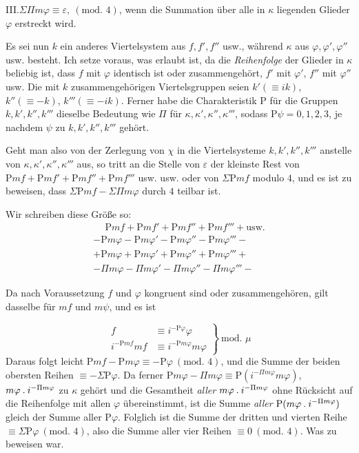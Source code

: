 III.\quad $\Sigma\Pi m\varphi\equiv\varepsilon,\ (\text{mod. }4)$, wenn die Summation über alle in $\kappa$ liegenden Glieder $\varphi$ erstreckt wird.

Es sei nun $k$ ein anderes Viertelsystem aus $f,f',f''$ usw., während $\kappa$ aus $\varphi,\varphi',\varphi''$ usw. besteht. Ich setze voraus, was erlaubt ist, da die \emph{Reihenfolge} der Glieder in $\kappa$ beliebig ist, dass $f$ mit $\varphi$ identisch ist oder zusammengehört, $f'$ mit $\varphi'$, $f''$ mit $\varphi''$ usw. Die mit $k$ zusammengehörigen Viertelsgruppen seien $k'(\equiv ik)$, $k''(\equiv-k)$, $k'''(\equiv-ik)$. Ferner habe die Charakteristik $\mathrm{P}$ für die Gruppen $k,k',k'',k'''$ dieselbe Bedeutung wie $\Pi$ für $\kappa,\kappa',\kappa'',\kappa'''$, sodass $\mathrm{P}\psi=0,1,2,3$, je nachdem $\psi$ zu $k,k',k'',k'''$ gehört.

Geht man also von der Zerlegung von $\chi$ in die Viertelsysteme $k,k',k'',k'''$ anstelle von $\kappa,\kappa',\kappa'',\kappa'''$ aus, so tritt an die Stelle von $\varepsilon$ der kleinste Rest von $\mathrm{P}mf+\mathrm{P}mf'+\mathrm{P}mf''+\mathrm{P}mf'''$ usw. usw. oder von $\Sigma\mathrm{P}mf$ modulo $4$, und es ist zu beweisen, dass $\Sigma\mathrm{P}mf-\Sigma\Pi m\varphi$ durch $4$ teilbar ist.

Wir schreiben diese Größe so:
\[
\begin{array}{l}
\phantom{+}\mathrm{P}mf+\mathrm{P}mf'+\mathrm{P}mf''+\mathrm{P}mf'''+\text{usw.}\\
-\mathrm{P}m\varphi-\mathrm{P}m\varphi'-\mathrm{P}m\varphi''-\mathrm{P}m\varphi'''-\\
+\mathrm{P}m\varphi+\mathrm{P}m\varphi'+\mathrm{P}m\varphi''+\mathrm{P}m\varphi'''+\\
-\Pi m\varphi-\Pi m\varphi'-\Pi m\varphi''-\Pi m\varphi'''-
\end{array}
\]

Da nach Voraussetzung $f$ und $\varphi$ kongruent sind oder zusammengehören, gilt dasselbe für $mf$ und $m\psi$, und es ist

\[
\left.\begin{aligned}
f&\equiv i^{-\mathrm{P}\varphi}\varphi\\
i^{-\mathrm{P}mf}mf&\equiv i^{-\mathrm{P}m\varphi}m\varphi
\end{aligned}\right\}\ \text{mod. }\mu
\]
Daraus folgt leicht $\mathrm{P}mf-\mathrm{P}m\varphi\equiv-\mathrm{P}\varphi\ (\text{mod. }4)$, und die Summe der beiden obersten Reihen $\equiv-\Sigma\mathrm{P}\varphi$. Da ferner $\mathrm{P}m\varphi-\Pi m\varphi\equiv\mathrm{P}(i^{-\Pi m\varphi}m\varphi)$, $m\varphi\mathbin{.} i^{-\Pi m\varphi}$ zu $\kappa$ gehört und die Gesamtheit \emph{aller} $m\varphi\mathbin{.} i^{-\Pi m\varphi}$ ohne Rücksicht auf die Reihenfolge mit allen $\varphi$ übereinstimmt, ist die Summe \emph{aller} $\mathrm{P}(m\varphi\mathbin{.} i^{-\Pi m\varphi})$ gleich der Summe aller $\mathrm{P}\varphi$. Folglich ist die Summe der dritten und vierten Reihe $\equiv\Sigma\mathrm{P}\varphi\ (\text{mod. }4)$, also die Summe aller vier Reihen $\equiv0\ (\text{mod. }4)$. Was zu beweisen war.

